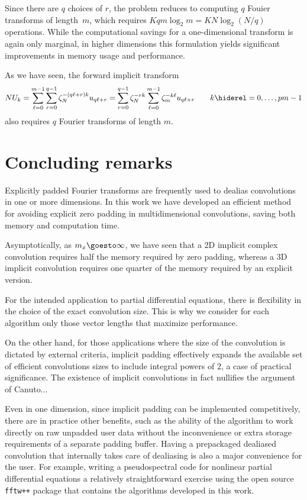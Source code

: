 \documentclass[final]{siamltex}
\def\no{\hiderel}
\begin{document}
Since there are $q$ choices of $r$, the problem reduces
to computing $q$ Fouier transforms of length~$m$, which requires
$K q m\log_2 m=K N\log_2 (N/q)$ operations.
While the computational savings for a one-dimensional transform is again only
marginal, in higher dimensions this formulation
yields significant improvements in memory usage and performance.

As we have seen, the forward implicit transform
$$
NU_k
=\sum_{\ell=0}^{m-1}\sum_{r=0}^{q-1} \zeta_N^{-(q\ell+r)k} u_{q\ell+r}
=\sum_{r=0}^{q-1}\zeta_N^{-rk}\sum_{\ell=0}^{m-1}\zeta_m^{-k\ell} u_{q\ell+r}
\qquad k\no =0,\ldots,pm-1
$$
also requires $q$ Fourier transforms of length $m$.

\section{Concluding remarks}
Explicitly padded Fourier transforms are frequently used to dealias
convolutions in one or more dimensions.
In this work we have developed an efficient method for avoiding explicit zero
padding in multidimensional convolutions, saving both memory and
computation time.

Asymptotically, as $m_x\goesto\infty$, we have seen that a 2D implicit
complex convolution requires half the memory required by zero padding,
whereas a 3D implicit convolution requires one quarter of the memory
required by an explicit version.

For the intended application to partial differential
equations, there is flexibility in the choice of the exact convolution
size. This is why we consider for each algorithm only those vector lengths
that maximize performance.

On the other hand, for those applications where the size of the convolution
is dictated by external criteria, implicit padding effectively expands the
available set of efficient convolutions sizes to include integral powers of
$2$, a case of practical significance. The existence of implicit convolutions in
fact nullifies the argument of Canuto...

Even in one dimension, since implicit padding can be implemented
competitively, there are in practice other benefits, such as the 
ability of the algorithm to work directly on raw unpadded user data without the
inconvenience or extra storage requirements of a separate padding buffer.
Having a prepackaged dealiased convolution that internally takes care of
dealiasing is also a major convenience for the user. For example,
writing a pseudospectral code for nonlinear partial differential
equations a relatively straightforward exercise using the 
open source {\tt fftw++} package that contains the algorithms developed in
this work.





\end{document}
